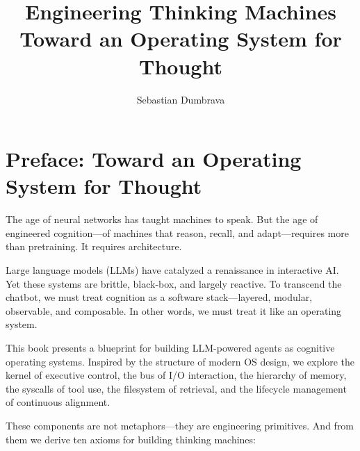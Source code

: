 \documentclass{book}
\title{Engineering Thinking Machines \\ \Large Toward an Operating System for Thought}
\author{Sebastian Dumbrava}
\date{} %
\begin{document}
\frontmatter %
\maketitle

\chapter*{Preface: Toward an Operating System for Thought}

The age of neural networks has taught machines to speak. But the age of engineered cognition—of machines that reason, recall, and adapt—requires more than pretraining. It requires architecture.

Large language models (LLMs) have catalyzed a renaissance in interactive AI. Yet these systems are brittle, black-box, and largely reactive. To transcend the chatbot, we must treat cognition as a software stack—layered, modular, observable, and composable. In other words, we must treat it like an operating system.

This book presents a blueprint for building LLM-powered agents as cognitive operating systems. Inspired by the structure of modern OS design, we explore the kernel of executive control, the bus of I/O interaction, the hierarchy of memory, the syscalls of tool use, the filesystem of retrieval, and the lifecycle management of continuous alignment.

These components are not metaphors—they are engineering primitives. And from them we derive ten axioms for building thinking machines:
\end{document}
